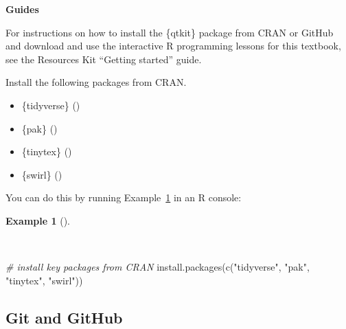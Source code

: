 \documentclass[
  letterpaper,
  krantz1]{latex/krantz-mod}
\newenvironment{Shaded}{\begin{snugshade}}{\end{snugshade}}
\newcommand{\CommentTok}[1]{\textcolor[rgb]{0.00,0.00,0.00}{\textit{#1}}}
\newcommand{\FunctionTok}[1]{\textcolor[rgb]{0.00,0.00,0.00}{#1}}
\newcommand{\NormalTok}[1]{\textcolor[rgb]{0.00,0.00,0.00}{#1}}
\newcommand{\StringTok}[1]{\textcolor[rgb]{0.00,0.00,0.00}{#1}}
\providecommand{\tightlist}{%
  \setlength{\itemsep}{0pt}\setlength{\parskip}{0pt}}\usepackage{longtable,booktabs,array}
\theoremstyle{definition}
\newtheorem{example}{Example}[chapter]
\theoremstyle{definition}
\theoremstyle{remark}
\begin{document}
\begin{tcolorbox}[enhanced jigsaw, leftrule=.75mm, colframe=quarto-callout-color-frame, left=2mm, colback=white, toprule=.15mm, breakable, arc=.35mm, opacityback=0, bottomrule=.15mm, rightrule=.15mm]

\textbf{ Guides}

For instructions on how to install the \{qtkit\} package from CRAN or
GitHub and download and use the interactive R programming lessons for
this textbook, see the Resources Kit ``Getting started'' guide.

\end{tcolorbox}

Install the following packages from CRAN.

\begin{itemize}
\tightlist
\item
  \{tidyverse\} ()
\item
  \{pak\} ()
\item
  \{tinytex\} ()
\item
  \{swirl\} ()
\end{itemize}

You can do this by running Example~\ref{exm-install-packages} in an R
console:

\begin{example}[]\protect\hypertarget{exm-install-packages}{}\label{exm-install-packages}

~

\begin{Shaded}
\begin{Highlighting}[numbers=left,,]
\CommentTok{\# install key packages from CRAN}
\FunctionTok{install.packages}\NormalTok{(}\FunctionTok{c}\NormalTok{(}\StringTok{"tidyverse"}\NormalTok{, }\StringTok{"pak"}\NormalTok{, }\StringTok{"tinytex"}\NormalTok{, }\StringTok{"swirl"}\NormalTok{))}
\end{Highlighting}
\end{Shaded}

\end{example}

\subsection*{Git and GitHub}\label{sec-preface-git-github}
\end{document}
